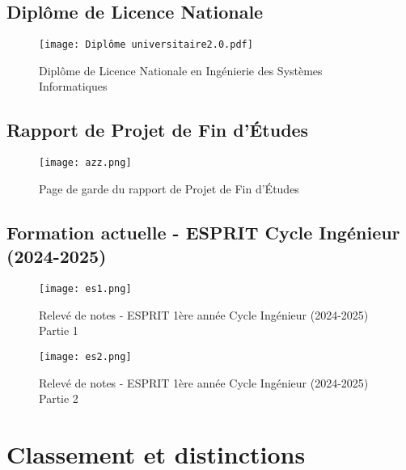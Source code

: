 \documentclass[12pt,a4paper]{report}
\begin{document}
\subsection{Diplôme de Licence Nationale}

\begin{figure}[H]
    \centering
    \texttt{[image: Diplôme universitaire2.0.pdf]}
    \caption{Diplôme de Licence Nationale en Ingénierie des Systèmes Informatiques}
    \label{fig:diploma_licence}
\end{figure}

\subsection{Rapport de Projet de Fin d'Études}

\begin{figure}[H]
    \centering
    \texttt{[image: azz.png]}
    \caption{Page de garde du rapport de Projet de Fin d'Études}
    \label{fig:pfe_cover}
\end{figure}

\subsection{Formation actuelle - ESPRIT Cycle Ingénieur (2024-2025)}

\begin{figure}[H]
    \centering
    \texttt{[image: es1.png]}
    \caption{Relevé de notes - ESPRIT 1ère année Cycle Ingénieur (2024-2025) Partie 1 }
    \label{fig:transcript_esprit}
\end{figure}
\begin{figure}[H]
    \centering
    \texttt{[image: es2.png]}
    \caption{Relevé de notes - ESPRIT 1ère année Cycle Ingénieur (2024-2025) Partie 2 }
    \label{fig:transcript_esprit}
\end{figure}

\section{Classement et distinctions}
\end{document}
